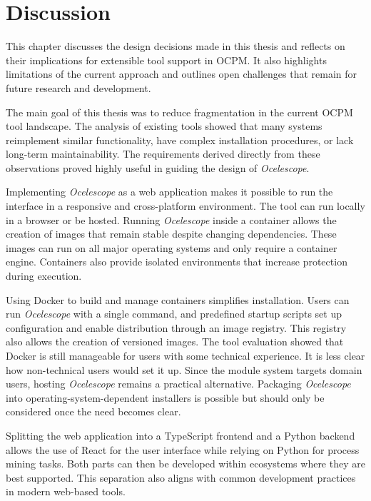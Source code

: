 \chapter{Discussion}
\label{chap:discussion}

This chapter discusses the design decisions made in this thesis and reflects on their implications for extensible tool support in OCPM.
It also highlights limitations of the current approach and outlines open challenges that remain for future research and development.

The main goal of this thesis was to reduce fragmentation in the current OCPM tool landscape.
The analysis of existing tools showed that many systems reimplement similar functionality, have complex installation procedures, or lack long-term maintainability.
The requirements derived directly from these observations proved highly useful in guiding the design of \textit{Ocelescope}.

Implementing \textit{Ocelescope} as a web application makes it possible to run the interface in a responsive and cross-platform environment.
The tool can run locally in a browser or be hosted.
Running \textit{Ocelescope} inside a container allows the creation of images that remain stable despite changing dependencies.
These images can run on all major operating systems and only require a container engine.
Containers also provide isolated environments that increase protection during execution.

Using Docker to build and manage containers simplifies installation.
Users can run \textit{Ocelescope} with a single command, and predefined startup scripts set up configuration and enable distribution through an image registry.
This registry also allows the creation of versioned images.
The tool evaluation showed that Docker is still manageable for users with some technical experience.
It is less clear how non-technical users would set it up.
Since the module system targets domain users, hosting \textit{Ocelescope} remains a practical alternative.
Packaging \textit{Ocelescope} into operating-system-dependent installers is possible but should only be considered once the need becomes clear.

Splitting the web application into a TypeScript frontend and a Python backend allows the use of React for the user interface while relying on Python for process mining tasks.
Both parts can then be developed within ecosystems where they are best supported.
This separation also aligns with common development practices in modern web-based tools.

